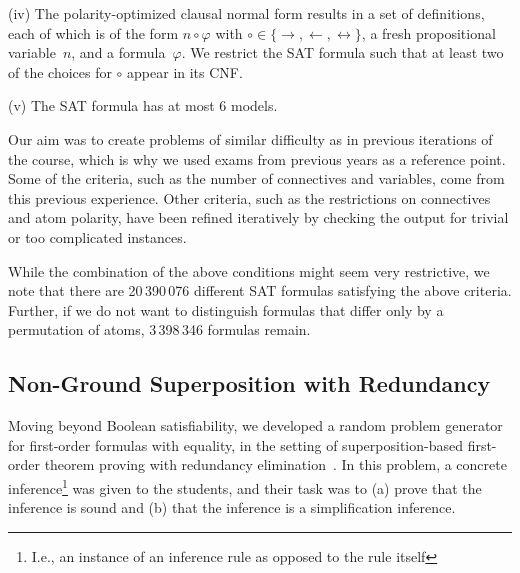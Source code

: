 \noindent(iv)
        The polarity-optimized clausal normal form results in a set of definitions,
        each of which is of the form
        $n \circ \varphi$ with $\circ \in \{ \rightarrow, \leftarrow, \leftrightarrow \}$,
        a fresh propositional variable~$n$, and a formula~$\varphi$.
        We restrict the SAT formula such that at least two of the choices for
        $\circ$ appear in its CNF.\smallskip

\noindent(v)
        The SAT formula has at most $6$ models.
        \smallskip


Our aim was to create problems of similar difficulty as in previous iterations of the course,
which is why we used exams from previous years as a reference point.
Some of the criteria, such as the number of connectives and variables,
come from this previous experience.
Other criteria, such as the restrictions on connectives and atom polarity,
have been refined iteratively by checking the output for trivial or too complicated instances.

While the combination of the above conditions might seem very restrictive,
we note that 
there are 20\,390\,076 different SAT formulas satisfying the above
criteria.
Further,
if we do not want to distinguish formulas that differ only by a permutation of atoms,
3\,398\,346 formulas remain.





\subsection{Non-Ground Superposition with Redundancy}\label{sec:fo}

Moving beyond Boolean satisfiability, we developed a random problem
generator for first-order formulas with equality, in the setting of
superposition-based first-order theorem proving with redundancy elimination~\cite{Rubio01,Vampire13}.
In this problem, a concrete inference\footnote{I.e., an instance of an inference rule as opposed to the rule itself}
was given to the students, and their task was to
(a) prove that the inference is sound
and (b) that the inference is a simplification inference.

